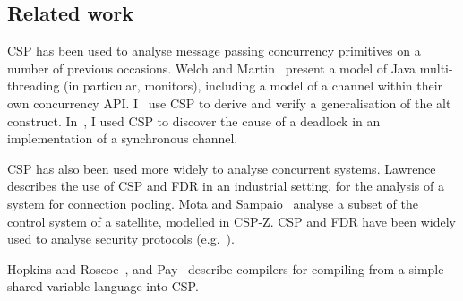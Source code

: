 \subsection{Related work}

CSP has been used to analyse message passing concurrency primitives on a
number of previous occasions.
%
Welch and Martin~\cite{welch-martin} present a model of Java multi-threading
(in particular, monitors), including a model of a channel within their own
concurrency API\@.
%
I~\cite{gavin:alt} use CSP to derive and verify a generalisation of the
alt construct.  
%
In~\cite{gavin:OneOne}, I used CSP to discover the cause of a deadlock in an
implementation of a synchronous channel. 

CSP has also been used more widely to analyse concurrent systems. 
%
Lawrence~\cite{lawrence} describes the use of CSP and FDR in an
industrial setting, for the analysis of a system for connection pooling.
% 
Mota and Sampaio~\cite{mota+sampaio} analyse a subset of the
control system of a satellite, modelled in CSP-Z\@.  
%
CSP and FDR have been widely used to analyse security protocols
(e.g.~\cite{gavin:NSFDR}).

Hopkins and Roscoe~\cite{hopkins-roscoe}, and Pay~\cite{alex:project} describe
compilers for compiling from a simple shared-variable language into CSP\@.






